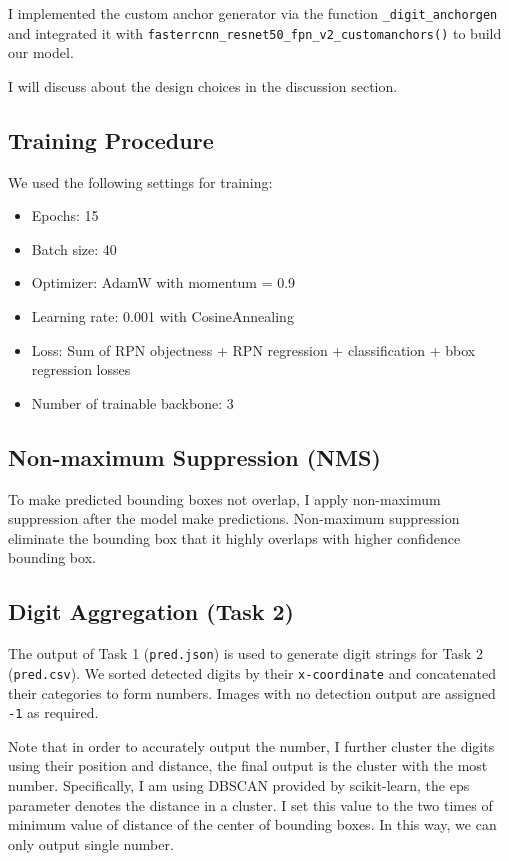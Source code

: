 \documentclass[twocolumn,a4paper]{article}
\begin{document}
I implemented the custom anchor generator via the function \texttt{\_digit\_anchorgen} and integrated it with \texttt{fasterrcnn\_resnet50\_fpn\_v2\_customanchors()} to build our model.

I will discuss about the design choices in the discussion section.

\subsection{Training Procedure}
We used the following settings for training:
\begin{itemize}
    \item Epochs: 15
    \item Batch size: 40
    \item Optimizer: AdamW with momentum = 0.9
    \item Learning rate: 0.001 with CosineAnnealing
    \item Loss: Sum of RPN objectness + RPN regression + classification + bbox regression losses
    \item Number of trainable backbone: 3
\end{itemize}

\subsection{Non-maximum Suppression (NMS)}

To make predicted bounding boxes not overlap, I apply non-maximum suppression after the model make predictions. Non-maximum suppression eliminate the bounding box that it highly overlaps with higher confidence bounding box.

\subsection{Digit Aggregation (Task 2)}
The output of Task 1 (\texttt{pred.json}) is used to generate digit strings for Task 2 (\texttt{pred.csv}). We sorted detected digits by their \texttt{x-coordinate} and concatenated their categories to form numbers. Images with no detection output are assigned \texttt{-1} as required.

Note that in order to accurately output the number, I further cluster the digits using their position and distance, the final output is the cluster with the most number. Specifically, I am using DBSCAN provided by scikit-learn, the eps parameter denotes the distance in a cluster. I set this value to the two times of minimum value of distance of the center of bounding boxes. In this way, we can only output single number.
\end{document}
